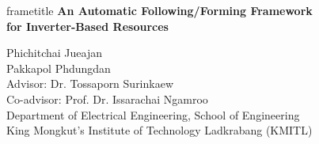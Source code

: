 \documentclass{beamer}
\begin{document}
\begin{frame}[plain]
\centering
\vspace{0.75cm}
\begin{beamercolorbox}[wd=0.86\paperwidth,sep=0.22cm,center]{frametitle}
{\Large\bfseries An Automatic Following/Forming Framework\\for Inverter-Based Resources}
\end{beamercolorbox}
\vspace{0.60cm}
{\fontsize{10.5}{13}\selectfont
Phichitchai Jueajan\\
Pakkapol Phdungdan\\[0.20cm]
Advisor: Dr. Tossaporn Surinkaew\\
Co-advisor: Prof. Dr. Issarachai Ngamroo\\[0.45cm]
Department of Electrical Engineering, School of Engineering\\
King Mongkut's Institute of Technology Ladkrabang (KMITL)
}
\end{frame}

\setlength{\abovedisplayskip}{5pt}
\setlength{\belowdisplayskip}{5pt}
\end{document}

